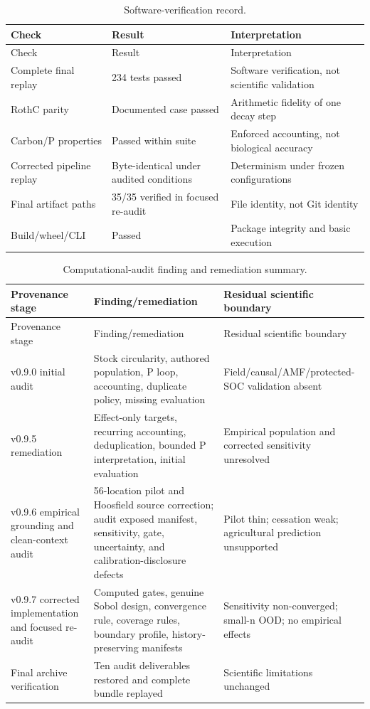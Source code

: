 \documentclass[11pt]{article}
\begin{document}
\begin{longtable}{P{0.27\textwidth}P{0.20\textwidth}P{0.45\textwidth}}
\caption{Software-verification record.}\label{tab:software-supp}\\
\toprule Check & Result & Interpretation \\
\midrule\endfirsthead
\toprule Check & Result & Interpretation \\
\midrule\endhead
Complete final replay & 234 tests passed & Software verification, not scientific validation \\
RothC parity & Documented case passed & Arithmetic fidelity of one decay step \\
Carbon/P properties & Passed within suite & Enforced accounting, not biological accuracy \\
Corrected pipeline replay & Byte-identical under audited conditions & Determinism under frozen configurations \\
Final artifact paths & 35/35 verified in focused re-audit & File identity, not Git identity \\
Build/wheel/CLI & Passed & Package integrity and basic execution \\
\bottomrule
\end{longtable}

\begin{longtable}{P{0.20\textwidth}P{0.31\textwidth}P{0.31\textwidth}}
\caption{Computational-audit finding and remediation summary.}\label{tab:audit-supp}\\
\toprule Provenance stage & Finding/remediation & Residual scientific boundary \\
\midrule\endfirsthead
\toprule Provenance stage & Finding/remediation & Residual scientific boundary \\
\midrule\endhead
v0.9.0 initial audit & Stock circularity, authored population, P loop, accounting, duplicate policy, missing evaluation & Field/causal/AMF/protected-SOC validation absent \\
v0.9.5 remediation & Effect-only targets, recurring accounting, deduplication, bounded P interpretation, initial evaluation & Empirical population and corrected sensitivity unresolved \\
v0.9.6 empirical grounding and clean-context audit & 56-location pilot and Hoosfield source correction; audit exposed manifest, sensitivity, gate, uncertainty, and calibration-disclosure defects & Pilot thin; cessation weak; agricultural prediction unsupported \\
v0.9.7 corrected implementation and focused re-audit & Computed gates, genuine Sobol design, convergence rule, coverage rules, boundary profile, history-preserving manifests & Sensitivity non-converged; small-n OOD; no empirical effects \\
Final archive verification & Ten audit deliverables restored and complete bundle replayed & Scientific limitations unchanged \\
\bottomrule
\end{longtable}
\end{document}
